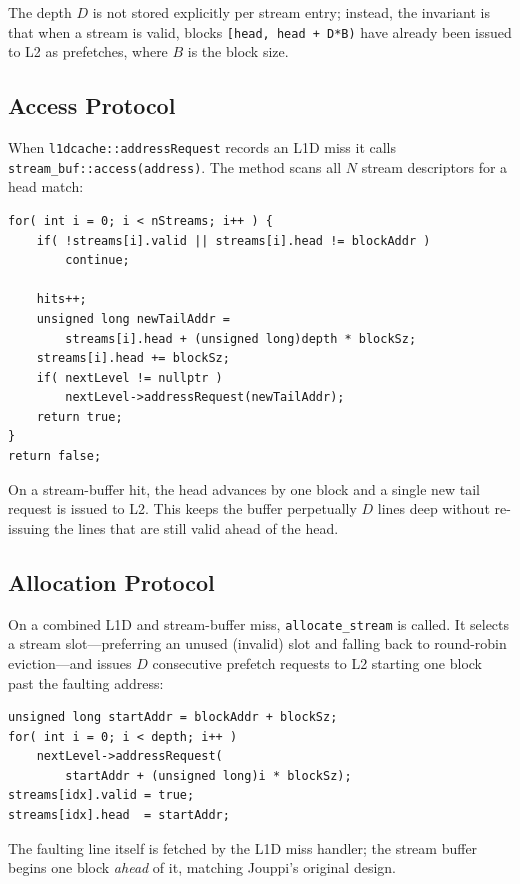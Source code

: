 \documentclass[11pt,letterpaper]{article}
\begin{document}
The depth \(D\) is not stored explicitly per stream entry; instead, the
invariant is that when a stream is valid, blocks \texttt{[head, head + D*B)}
have already been issued to L2 as prefetches, where \(B\) is the block size.

\subsection{Access Protocol}

When \texttt{l1dcache::addressRequest} records an L1D miss it calls
\texttt{stream\_buf::access(address)}. The method scans all \(N\) stream
descriptors for a head match:

\begin{verbatim}
for( int i = 0; i < nStreams; i++ ) {
    if( !streams[i].valid || streams[i].head != blockAddr )
        continue;

    hits++;
    unsigned long newTailAddr =
        streams[i].head + (unsigned long)depth * blockSz;
    streams[i].head += blockSz;
    if( nextLevel != nullptr )
        nextLevel->addressRequest(newTailAddr);
    return true;
}
return false;
\end{verbatim}

On a stream-buffer hit, the head advances by one block and a single new tail
request is issued to L2. This keeps the buffer perpetually \(D\) lines deep
without re-issuing the lines that are still valid ahead of the head.

\subsection{Allocation Protocol}

On a combined L1D and stream-buffer miss, \texttt{allocate\_stream} is called.
It selects a stream slot---preferring an unused (invalid) slot and falling back
to round-robin eviction---and issues \(D\) consecutive prefetch requests to L2
starting one block past the faulting address:

\begin{verbatim}
unsigned long startAddr = blockAddr + blockSz;
for( int i = 0; i < depth; i++ )
    nextLevel->addressRequest(
        startAddr + (unsigned long)i * blockSz);
streams[idx].valid = true;
streams[idx].head  = startAddr;
\end{verbatim}

The faulting line itself is fetched by the L1D miss handler; the stream buffer
begins one block \emph{ahead} of it, matching Jouppi's original design.
\end{document}
